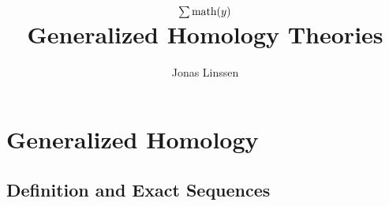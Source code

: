 

\title{$\sum\text{math}(y)$\\Generalized Homology Theories}
\author{Jonas Linssen}


	\maketitle
	\tableofcontents

	\newpage
	\section{Generalized Homology}
	\subsection{Definition and Exact Sequences}

